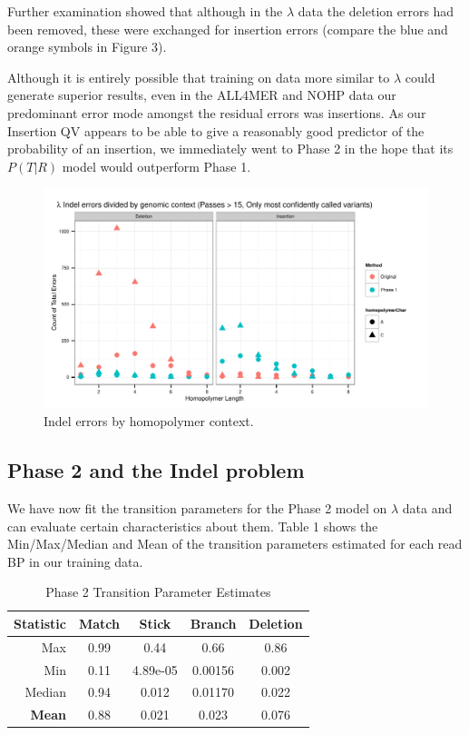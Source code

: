 \documentclass[DIV=calc, paper=a4, fontsize=11pt, twocolumn]{scrartcl}	 %
\begin{document}
Further examination showed that although in the $\lambda$ data the deletion errors had been removed, these were exchanged for insertion errors (compare the blue and orange symbols in Figure 3).

Although it is entirely possible that training on data more similar to $\lambda$ could generate superior results, even in the ALL4MER and NOHP data our predominant error mode amongst the residual errors was insertions.  As our Insertion QV appears to be able to give a reasonably good predictor of the probability of an insertion, we immediately went to Phase 2 in the hope that its $P(T|R)$ model would outperform Phase 1.

\begin{figure}[ht]
\includegraphics{LambdaByContext}
\caption{Indel errors by homopolymer context.}
\end{figure}



\subsection*{Phase 2 and the Indel problem}

We have now fit the transition parameters for the Phase 2 model on $\lambda$ data and can evaluate certain characteristics about them.  Table 1 shows the Min/Max/Median and Mean of the transition parameters estimated for each read BP in our training data.  

\begin{table}[ht]
\caption{Phase 2 Transition Parameter Estimates}
\centering
\begin{tabular}{ | r | c | c | c | c | }
\hline

Statistic & Match & Stick & Branch & Deletion \\ \hline
Max & 0.99 & 0.44 & 0.66 & 0.86\\
Min & 0.11 & 4.89e-05 & 0.00156 & 0.002\\
Median & 0.94 & 0.012 & 0.01170 & 0.022\\ \hline
\textbf{Mean} & 0.88 & 0.021 & 0.023 & 0.076 \\
\bottomrule
\end{tabular}
\end{table}
\end{document}
